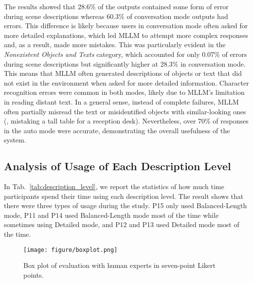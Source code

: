The results showed that 28.6\% of the outputs contained some form of error during scene descriptions whereas 60.3\% of conversation mode outputs had errors.
This difference is likely because users in conversation mode often asked for more detailed explanations, which led MLLM to attempt more complex responses and, as a result, made more mistakes.
This was particularly evident in the \textit{Nonexistent Objects and Texts} category, which accounted for only 0.07\% of errors during scene descriptions but significantly higher at 28.3\% in conversation mode.
This means that MLLM often generated descriptions of objects or text that did not exist in the environment when asked for more detailed information.
Character recognition errors were common in both modes, likely due to MLLM’s limitation in reading distant text. 
In a general sense, instead of complete failures, MLLM often partially misread the text or misidentified objects with similar-looking ones (\eg, mistaking a tall table for a reception desk).
Nevertheless, over 70\% of responses in the auto mode were accurate, demonstrating the overall usefulness of the system.

\subsection{Analysis of Usage of Each Description Level}
\label{sec:description_level_analysis}
In Tab.~\ref{tab:description_level}, we report the statistics of how much time participants spend their time using each description level.
The result shows that there were three types of usage during the study. 
P15 only used Balanced-Length mode, P11 and P14 used Balanced-Length mode most of the time while sometimes using Detailed mode, and P12 and P13 used Detailed mode most of the time. 

\begin{figure*}
    \centering
    \texttt{[image: figure/boxplot.png]}
    \caption{Box plot of evaluation with human experts in seven-point Likert points.}
    \label{fig:boxplot}
\end{figure*}

